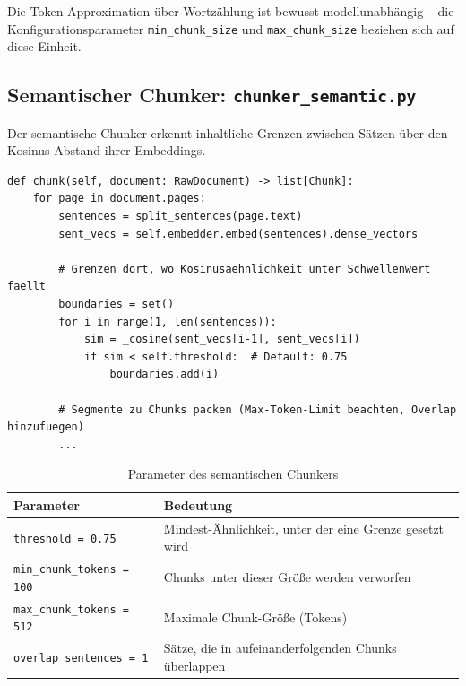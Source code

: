 \documentclass[12pt, a4paper]{article}
\begin{document}
Die Token-Approximation über Wortzählung ist bewusst modellunabhängig -- die
Konfigurationsparameter \texttt{min\_chunk\_size} und \texttt{max\_chunk\_size}
beziehen sich auf diese Einheit.

\subsection{Semantischer Chunker: \texttt{chunker\_semantic.py}}

Der semantische Chunker erkennt inhaltliche Grenzen zwischen Sätzen über den
Kosinus-Abstand ihrer Embeddings.

\begin{lstlisting}[style=pythonstyle, caption={Semantische Grenzenerkennung}]
def chunk(self, document: RawDocument) -> list[Chunk]:
    for page in document.pages:
        sentences = split_sentences(page.text)
        sent_vecs = self.embedder.embed(sentences).dense_vectors

        # Grenzen dort, wo Kosinusaehnlichkeit unter Schwellenwert faellt
        boundaries = set()
        for i in range(1, len(sentences)):
            sim = _cosine(sent_vecs[i-1], sent_vecs[i])
            if sim < self.threshold:  # Default: 0.75
                boundaries.add(i)

        # Segmente zu Chunks packen (Max-Token-Limit beachten, Overlap hinzufuegen)
        ...
\end{lstlisting}

\begin{table}[H]
\centering
\small
\begin{tabular}{ll}
\toprule
\textbf{Parameter} & \textbf{Bedeutung} \\
\midrule
\texttt{threshold = 0.75} & Mindest-Ähnlichkeit, unter der eine Grenze gesetzt wird \\
\texttt{min\_chunk\_tokens = 100} & Chunks unter dieser Größe werden verworfen \\
\texttt{max\_chunk\_tokens = 512} & Maximale Chunk-Größe (Tokens) \\
\texttt{overlap\_sentences = 1} & Sätze, die in aufeinanderfolgenden Chunks überlappen \\
\bottomrule
\end{tabular}
\caption{Parameter des semantischen Chunkers}
\end{table}

\end{document}
